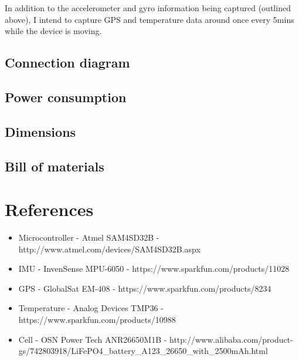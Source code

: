 \documentclass[a4paper, twoside]{article}
\begin{document}
In addition to the accelerometer and gyro information being captured (outlined
above), I intend to capture GPS and temperature data around once every 5mins while the device is
moving.

\subsection{Connection diagram}

\subsection{Power consumption}

\subsection{Dimensions}

\subsection{Bill of materials}

\section{References}
\begin{itemize}
	\item{Microcontroller - Atmel SAM4SD32B - http://www.atmel.com/devices/SAM4SD32B.aspx}
	\item{IMU - InvenSense MPU-6050 - https://www.sparkfun.com/products/11028}
	\item{GPS - GlobalSat EM-408 - https://www.sparkfun.com/products/8234}
	\item{Temperature - Analog Devices TMP36 - https://www.sparkfun.com/products/10988}
	\item{Cell - OSN Power Tech ANR26650M1B -
		http://www.alibaba.com/product-gs/742803918/LiFePO4\_battery\_A123\_26650\_with\_2500mAh.html}
\end{itemize}
\end{document}
